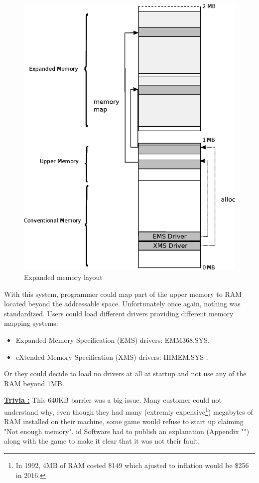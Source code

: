 \documentclass[book.tex]{subfiles}
\begin{document}
\begin{figure}[H]
\centering
\includegraphics[width=\textwidth]{imgs/expanded_ram}
\caption{Expanded memory layout}
\label{fig:ems_xms_layout}
\end{figure}
With this system, programmer could map part of the upper memory to RAM located beyond the addressable space.
Unfortunately once again, nothing was standardized. Users could load different drivers providing different memory mapping systems:
\begin{itemize}
\item Expanded Memory Specification (EMS) drivers: EMM368.SYS.
\item eXtended Memory Specification (XMS) drivers: HIMEM.SYS .
\end{itemize}

Or they could decide to load no drivers at all at startup and not use any of the RAM beyond 1MB.\\
\par
\textbf{\underline{Trivia :}}  This 640KB barrier was a big issue. Many customer could not understand why, even though they had many (extremly expensive\footnote{In 1992, 4MB of RAM costed \$149 which ajusted to inflation would be \$256 in 2016.}) megabytes of RAM installed on their machine, some game would refuse to start up claiming "Not enough memory". id Software had to publish an explanation (Appendix "") along with the game to make it clear that it was not their fault.\\
\end{document}
